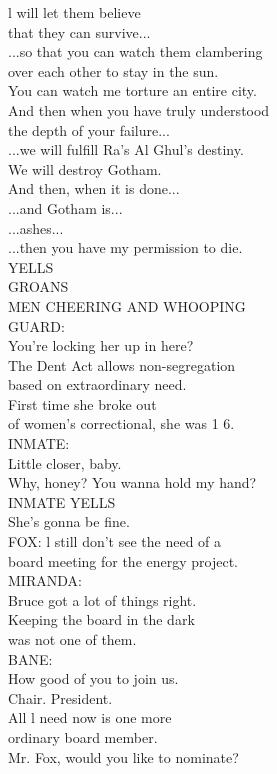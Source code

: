 \documentclass{article}
\begin{document}
\begin{multicols}{3}
l will let them believe\\
that they can survive...\\
...so that you can watch them clambering\\
over each other to stay in the sun.\\
You can watch me torture an entire city.\\
And then when you have truly understood\\
the depth of your failure...\\
...we will fulfill Ra's Al Ghul's destiny.\\
We will destroy Gotham.\\
And then, when it is done...\\
...and Gotham is...\\
...ashes...\\
...then you have my permission to die.\\
YELLS\\
GROANS\\
MEN CHEERING AND WHOOPING\\
GUARD:\\
You're locking her up in here?\\
The Dent Act allows non-segregation\\
based on extraordinary need.\\
First time she broke out\\
of women's correctional, she was 1 6.\\
INMATE:\\
Little closer, baby.\\
Why, honey? You wanna hold my hand?\\
INMATE YELLS\\
She's gonna be fine.\\
FOX: l still don't see the need of a\\
board meeting for the energy project.\\
MIRANDA:\\
Bruce got a lot of things right.\\
Keeping the board in the dark\\
was not one of them.\\
BANE:\\
How good of you to join us.\\
Chair. President.\\
All l need now is one more\\
ordinary board member.\\
Mr. Fox, would you like to nominate?\\

\end{multicols}
\end{document}
